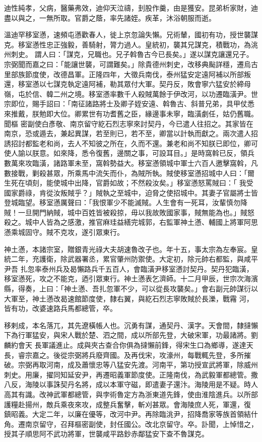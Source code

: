 \begin{pinyinscope}
 迪性純孝，父病，醫藥弗效，迪仰天泣禱，刲股作羹，由是獲安。昆弟析家財，迪盡以與之，一無所取。官爵之蔭，率先諸姪。疾革，沐浴朝服而逝。



 溫迪罕移室懣，速頻屯懣歡春人，徙上京忽論失懶。兄術輦，國初有功，授世襲謀克。移室懣性忠正強毅，善騎射，膂力過人。皇統初，襲其兄謀克，積戰功，為洮州刺史。
 謂人曰：「謀克，兄職也。兄子斡魯古今已長矣。」遂以謀克讓還兄子。宗弼聞而嘉之曰：「能讓世襲，可謂難矣。」除貴德州刺史，改移典颭詳穩，遷烏古里部族節度使，改德昌軍。正隆四年，大徵兵南伐，泰州猛安定遠阿補以所部叛還，移室懣以七謀克執定遠阿補，勒其眾付大軍。契丹反，敗會寧六猛安於締母嶺，屯於信、韓二州之境。移室懣率數千人殺賊萬餘于伊改河，以功遷臨潢尹。世宗即位，賜手詔曰：「南征諸路將士及卿子姪安遠、斡魯古、斜普兄弟，具甲仗悉來推戴，朕勉即大位。卿累世有功耆舊之臣，緣邊事未寧，臨潢劇任，姑仍舊職。聞樞
 密副使白彥敬、南京留守紇石烈志寧來討契丹，今已遣人往招之。其家皆在南京，恐或遁去，兼起異謀，若至則已，若不至，卿當以計執而獻之。兩次遣人招誘招討都監老和尚，去人不知彼之所在，久而不還。兼老和尚不知朕已即位，卿可使人諭以朕意。如來降，悉令復舊，邊關之事，可設耳目。」是時窩斡已反，領兵數萬來攻臨潢，諸路軍未至，窩斡勢益大。移室懣領城中軍士六百人邀擊窩斡，凡數接戰，剿殺甚眾，所乘馬中流矢而仆，為賊所執。賊使移室懣招城中人曰：「爾生死在頃刻，能使城中出降，官爵如故；不然殺汝矣。」移室懣怒罵賊曰：「
 我受國家爵祿，肯從汝叛賊乎？」賊執之至城中，迫脅之使招城中。其妻子官屬將士皆登城臨望。移室懣厲聲曰：「我恨軍少不能滅賊。人生會有一死耳，汝輩慎勿降賊！一旦開門納賊，城中百姓皆被殺掠，毋以我故敗國家事，賊無能為也。」賊怒殺之。城中人皆為之感激，推官麻珪益繕完城郭，右監軍神土懣、輔國上將軍阿思懣乘城固守。賊不克攻，遂引眾東行。


神土懣，本諸宗室，贈銀青光祿大夫胡速魯改子也。年十五，事太宗為左奉宸。皇統二年，充護衛，除武器署丞，累官肇州防禦使。大定初，除元帥右都監，與咸平尹吾
 扎忽率泰州兵及曷懶路兵千五百人，會臨潢尹移室懣討契丹。契丹犯臨潢，移室懣死，攻之不能克，迺引眾東行。神土懣表乞濟師。十二月甲辰，世宗次海濱縣，得奏，上曰：「神土懣、吾扎忽軍不少，可以從長攻襲矣。」會右副元帥謀衍以大軍至，神土懣改曷速館節度使，隸右翼，與紇石烈志寧敗賊於長濼，戰霿
 河，皆有功，改婆速路兵馬都總管，卒。



 移剌成，本名落兀，其先遼橫帳人也。沉勇有謀，通契丹、漢字。天會間，隸撻懶下為行軍猛安，與宋人戰於楚、泗之間，成以所部先登，大破宋軍，功最諸將。劉麟約會天
 長軍議進止。成與夾古查合你俱為撻懶前鋒，得宋生口為鄉導，遂達天長，睿宗嘉之。後從宗弼將兵廢齊國。及再伐宋，攻濠州，每戰輒先登，多所摧破。宗弼再取河南，成及蕭懷忠等八猛安先渡。河南平，第功授宣武將軍，除威州刺史。用廉，擢同知延安尹，再遷昭義軍節度使。正隆南伐，為武毅軍都總管。撒八反，海陵以事誅契丹名將，成以本軍守磁，即遣妻子還汴。海陵用是不疑。時人高其有識。改神武軍都總管，與孛術魯定方為浙東道先鋒，使由淮陰進兵。以所部護糧赴揚州，敵兵乘夜來攻，成整兵奮擊，斬刈甚眾。會海陵庶人死，軍還，復
 鎮昭義。大定二年，以廉在優等，改河中尹。再除臨洮尹，招降喬家等族首領結什角。遷南京留守，召拜樞密副使，封任國公。改北京留守。卒。訃聞，上悼惜之，授其子順思阿不武功將軍，世襲咸平路鈔赤鄰猛安下查不魯謀克。




\end{pinyinscope}
